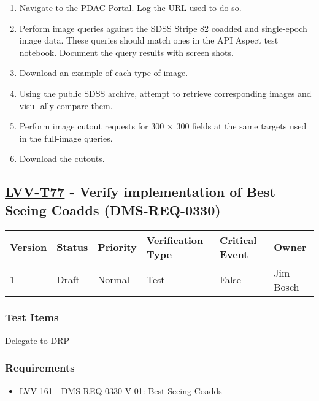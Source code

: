 \begin{enumerate}
\tightlist
\item
  Navigate to the PDAC Portal. Log the URL used to do so.
\item
  Perform image queries against the SDSS Stripe 82 coadded and
  single-epoch image data. These queries should match ones in the API
  Aspect test notebook. Document the query results with screen shots.
\item
  Download an example of each type of image.
\item
  Using the public SDSS archive, attempt to retrieve corresponding
  images and visu- ally compare them.
\item
  Perform image cutout requests for 300 × 300 fields at the same targets
  used in the full-image queries.
\item
  Download the cutouts.
\end{enumerate}

\hypertarget{lvv-t77---verify-implementation-of-best-seeing-coadds-dms-req-0330}{%
\subsection{\texorpdfstring{\href{https://jira.lsstcorp.org/secure/Tests.jspa\#/testCase/LVV-T77}{LVV-T77}
- Verify implementation of Best Seeing Coadds
(DMS-REQ-0330)}{LVV-T77 - Verify implementation of Best Seeing Coadds (DMS-REQ-0330)}}\label{lvv-t77---verify-implementation-of-best-seeing-coadds-dms-req-0330}}

\begin{longtable}[]{@{}llllll@{}}
\toprule
Version & Status & Priority & Verification Type & Critical Event &
Owner\tabularnewline
\midrule
\endhead
1 & Draft & Normal & Test & False & Jim Bosch\tabularnewline
\bottomrule
\end{longtable}

\hypertarget{test-items-166}{%
\subsubsection{Test Items}\label{test-items-166}}

Delegate to DRP

\hypertarget{requirements-167}{%
\subsubsection{Requirements}\label{requirements-167}}

\begin{itemize}
\tightlist
\item
  \href{https://jira.lsstcorp.org/browse/LVV-161}{LVV-161} -
  DMS-REQ-0330-V-01: Best Seeing Coadds
\end{itemize}

